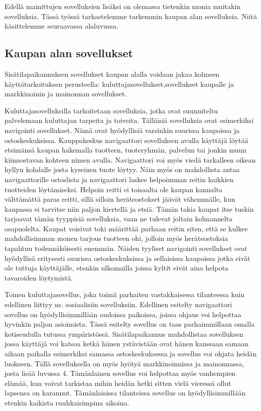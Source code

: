 Edellä mainittujen sovelluksien lisäksi on olemassa tietenkin monia muitakin sovelluksia. Tässä työssä tarkastelemme tarkemmin kaupan alan sovelluksia. Niitä käsittelemme seuraavassa alaluvussa.

\subsection{Kaupan alan sovellukset}
Sisätilapaikannuksen sovellukset kaupan alalla voidaan jakaa kolmeen käyttötarkoituksen perusteella: kuluttajasovellukset,sovellukset kaupalle ja markkinoinin ja mainonnan sovellukset.

Kuluttajasovelluksilla tarkoitetaan sovelluksia, jotka ovat suunniteltu palvelemaan kuluttajan tarpeita ja toiveita. Tälläisiä sovelluksia ovat esimerkiksi navigointi sovellukset. Nämä ovat hyödyllisiä varsinkin suurissa kaupoissa ja ostoskeskuksissa. Kauppakeskus navigaattori sovelluksen avulla käyttäjä löytää etsimänsä kaupan hakemalla tuotteen, tuoteryhmän, palvelun tai jonkin muun kiinnostavan kohteen nimen avulla. Navigaattori voi myös viedä tarkalleen oikean hyllyn kohdalle josta kyseinen tuote löytyy. Näin myös on mahdollista antaa navigaattorille ostoslista ja navigaattori laskee helpoimman reitin kaikkien tuotteiden löytämiseksi. Helpoin reitti ei toisaalta ole kaupan kannalta välttämättä paras reitti, sillä silloin heräteostokset jäävät vähemmälle, kun kaupassa ei tarvitse niin paljon kiertellä ja etsiä. Tämän takia kaupat itse tuskin tarjoavat tämän tyyppisiä sovelluksia, vaan ne tulevat joltain kolmannelta osapuolelta. Kaupat voisivat toki määrittää parhaan reitin siten, että se kulkee mahdollisimman monen tarjous tuotteen ohi, jolloin myös heräteostoksia tapahtuu todennäköisesti enemmän. Näiden tyyliset navigointi sovellukset ovat hyödyllisä eritysesti suurissa ostoskeskuksissa ja sellaisissa kaupoissa jotka eivät ole tuttuja käyttäjälle, etenkin ulkomailla joissa kyltit eivät aina helpota tavaroiden löytymistä.

Toinen kuluttajasovellus, joka toimii parhaiten vastakkaisessa tilanteessa kuin edellinen liittyy ns. sosiaalisiin sovelluksiin. Edellinen esitelty navigaattori sovellus on hyödyllisimmillään oudoissa paikoissa, joissa ohjaus voi helpottaa hyvinkin paljon asioimista. Tässä esitelty sovellus  on taas parhaimmillaan omalla kotiseudulla tutussa ympäristössä. Sisätilapaikannus mahdollistaa sovelluksen jossa käyttäjä voi katsoa ketkä hänen ystävistään ovat hänen kanssaan samaan aikaan paikalla esimerkiksi samassa ostoskeskuksessa ja sovellus voi ohjata heidän luokseen.  Tällä sovelluksella on myös hyötyä markkinoinnissa ja mainonnassa, josta lisää luvussa 4. Tämänlainen sovellus voi helpottaa myös vanhempien elämää, kun voivat tarkistaa mihin heidän hetki sitten vielä vieressä ollut lapsensa on karannut. Tämänlaisissa tilanteissa sovellus on hyödyllisimmillään etenkin kaikista ruuhkaisimpina aikoina.

